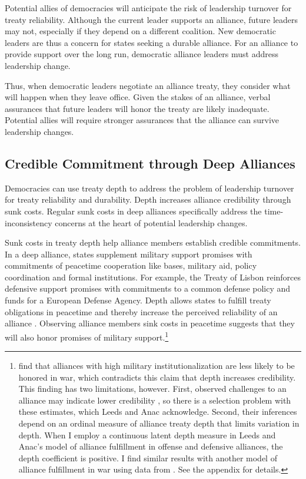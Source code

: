 \documentclass[12pt]{article}
\begin{document}
Potential allies of democracies will anticipate the risk of leadership turnover for treaty reliability. 
Although the current leader supports an alliance, future leaders may not, especially if they depend on a different coalition. 
New democratic leaders are thus a concern for states seeking a durable alliance. 
For an alliance to provide support over the long run, democratic alliance leaders must address leadership change.


Thus, when democratic leaders negotiate an alliance treaty, they consider what will happen when they leave office.
Given the stakes of an alliance, verbal assurances that future leaders will honor the treaty are likely inadequate.
Potential allies will require stronger assurances that the alliance can survive leadership changes. 


\subsection{Credible Commitment through Deep Alliances}


Democracies can use treaty depth to address the problem of leadership turnover for treaty reliability and durability. 
Depth increases alliance credibility through sunk costs.
Regular sunk costs in deep alliances specifically address the time-inconsistency concerns at the heart of potential leadership changes.


Sunk costs in treaty depth help alliance members establish credible commitments.
In a deep alliance, states supplement military support promises with commitments of peacetime cooperation like bases, military aid, policy coordination and formal institutions. 
For example, the Treaty of Lisbon reinforces defensive support promises with commitments to a common defense policy and funds for a European Defense Agency. 
Depth allows states to fulfill treaty obligations in peacetime and thereby increase the perceived reliability of an alliance \citep{Morrow1994}. 
Observing alliance members sink costs in peacetime suggests that they will also honor promises of military support.\footnote{\citet{LeedsAnac2005} find that alliances with high military institutionalization are less likely to be honored in war, which contradicts this claim that depth increases credibility. 
This finding has two limitations, however. 
First, observed challenges to an alliance may indicate lower credibility \citep{Smith1995}, so there is a selection problem with these estimates, which Leeds and Anac acknowledge. 
Second, their inferences depend on an ordinal measure of alliance treaty depth that limits variation in depth. 
When I employ a continuous latent depth measure in Leeds and Anac's model of alliance fulfillment in offense and defensive alliances, the depth coefficient is positive. 
I find similar results with another model of alliance fulfillment in war using data from \citet{BerkemeierFuhrmann2018}.
See the appendix for details.} 
\end{document}
